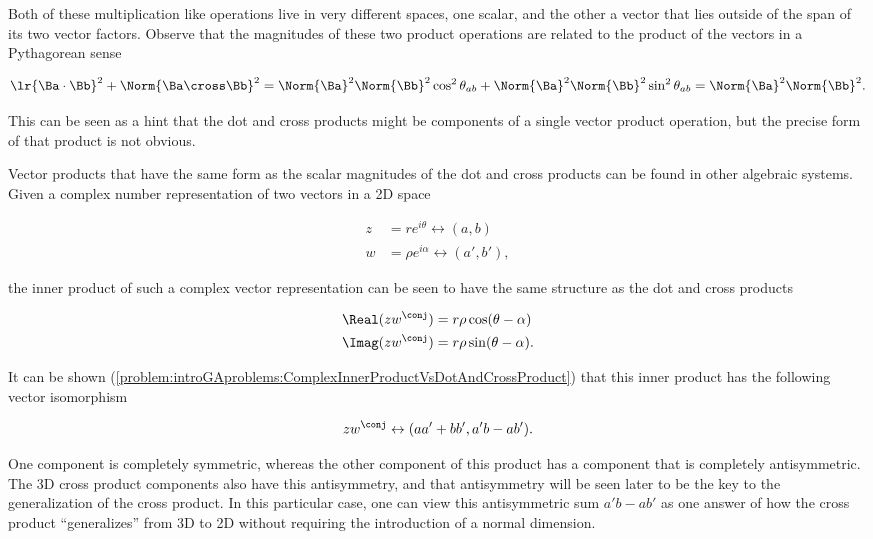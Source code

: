 Both of these multiplication like operations live in very different spaces, one scalar, and the other a vector that lies outside of the span of its two vector factors.  Observe that the magnitudes of these two product operations are related to the product of the vectors in a Pythagorean sense

\begin{dmath}\label{eqn:GAmotivation:180}
\lr{ \Ba \cdot \Bb }^2 + \Norm{ \Ba \cross \Bb }^2
=
\Norm{\Ba}^2 \Norm{\Bb}^2 \cos^2 \theta_{ab}
+\Norm{\Ba}^2 \Norm{\Bb}^2 \sin^2 \theta_{ab}
=
\Norm{\Ba}^2 \Norm{\Bb}^2.
\end{dmath}

This can be seen as a hint that the dot and cross products might be components of a single vector product operation, but the precise form of that product is not obvious.

Vector products that have the same form as the scalar magnitudes of the dot and cross products can be found in other algebraic systems.  Given a complex number representation of two vectors in a 2D space

\begin{dmath}\label{eqn:GAmotivation:200}
\begin{aligned}
z &= r e^{i \theta} \leftrightarrow (a, b) \\
w &= \rho e^{i \alpha} \leftrightarrow (a', b'),
\end{aligned}
\end{dmath}

the inner product of such a complex vector representation can be seen to have the same structure as the dot and cross products

\begin{equation}\label{eqn:GAmotivation:100}
\begin{aligned}
\Real( z w^\conj ) &= r \rho \cos(\theta - \alpha) \\
\Imag( z w^\conj ) &= r \rho \sin(\theta - \alpha).
\end{aligned}
\end{equation}

It can be shown
(\cref{problem:introGAproblems:ComplexInnerProductVsDotAndCrossProduct})
that this inner product has the following vector isomorphism

\begin{dmath}\label{eqn:GAmotivation:220}
z w^\conj \leftrightarrow ( a a' + b b', a' b - a b' ).
\end{dmath}

One component is completely symmetric, whereas the other component of this product has a component that is completely antisymmetric.
The 3D cross product components also have this antisymmetry, and that antisymmetry will be seen later to be the key to the generalization of the cross product.  In this particular case, one can view this antisymmetric sum \( a' b - a b' \) as one
answer of how the cross product ``generalizes'' from 3D to 2D without requiring the introduction of a normal dimension.

